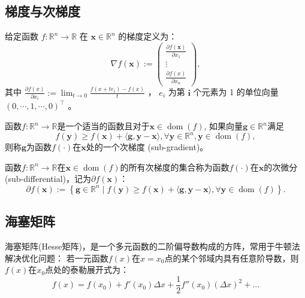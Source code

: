 \subsection{梯度与次梯度}
\begin{definition}[梯度]
    给定函数 $f: \mathbb{R}^{n} \rightarrow \mathbb{R}$ 在 $\bm{x} \in \mathbb{R}^{n}$ 的梯度定义为：
\begin{equation}
    \nabla f(\bm{x}):=\left(\begin{array}{c}
    \frac{\partial f(\bm{x})}{\partial x_{1}} \\
    \vdots \\
    \frac{\partial f(x)}{\partial x_{n}}
    \end{array}\right),
    \nonumber
\end{equation}
其中 $\frac{\partial f(x)}{\partial x_{i}}:=\lim _{t \rightarrow 0} \frac{f\left(x+t e_{i}\right)-f(x)}{t}$ ， $e_{i}$ 为第 $\bm{i}$ 个元素为 1 的单位向量 $(0, \cdots, 1, \cdots, 0)^{\top}$ 。 
\end{definition}

\begin{definition}[次梯度]
    函数$f: \mathbb{R}^{n} \rightarrow \mathbb{R}$是一个适当的函数且对于$\bm{x} \in \operatorname{dom}(f)$, 如果向量$\bm{g} \in \mathbb{R}^{n}$满足
    \begin{equation}
        f(\bm{y}) \geq f(\bm{x})+\langle\bm{g}, \bm{y}-\bm{x}\rangle, \forall \bm{y} \in \mathbb{R}^{n}, \bm{y} \in \operatorname{dom}(f) ,
        \nonumber
    \end{equation}
    则称$\bm{g}$为函数$f(\cdot)$在$\bm{x}$处的一个次梯度 (sub-gradient)。
\end{definition}

\begin{definition}[次微分]
    函数$f: \mathbb{R}^{n} \rightarrow \mathbb{R}$在$\bm{x} \in \operatorname{dom}(f)$的所有次梯度的集合称为函数$f(\cdot)$在$\bm{x}$的次微分 (sub-differential)，记为$\partial f(\bm{x})$：
    \begin{equation}
        \partial f(\bm{x}):=\left\{\bm{g} \in \mathbb{R}^{n} \mid f(\bm{y}) \geq f(\bm{x})+\langle\bm{g}, \bm{y}-\bm{x}\rangle, \forall \bm{y} \in \operatorname{dom}(f)\right\} .
        \nonumber
    \end{equation}
\end{definition}



\subsection{海塞矩阵}
海塞矩阵(Hesse矩阵)，是一个多元函数的二阶偏导数构成的方阵，常用于牛顿法解决优化问题：
若一元函数$f(x)$在$x=x_0$点的某个邻域内具有任意阶导数，则$f(x)$在$x_0$点处的泰勒展开式为：
\begin{equation}
    f(x) = f(x_0) + f'(x_0)\Delta x + \frac{1}{2}f''(x_0)(\Delta x)^2 + ...
\end{equation}

